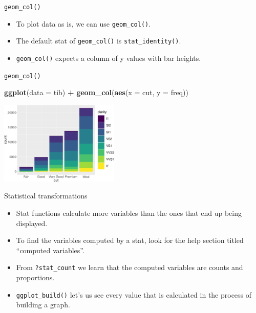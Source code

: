 \documentclass[ignorenonframetext,]{beamer}
\newenvironment{Shaded}{\begin{snugshade}}{\end{snugshade}}
\newcommand{\DataTypeTok}[1]{\textcolor[rgb]{0.13,0.29,0.53}{#1}}
\newcommand{\KeywordTok}[1]{\textcolor[rgb]{0.13,0.29,0.53}{\textbf{#1}}}
\newcommand{\NormalTok}[1]{#1}
\newcommand{\OperatorTok}[1]{\textcolor[rgb]{0.81,0.36,0.00}{\textbf{#1}}}
\newcommand{\StringTok}[1]{\textcolor[rgb]{0.31,0.60,0.02}{#1}}
\begin{document}
\begin{frame}[fragile]{\texttt{geom\_col()}}
\protect\hypertarget{geom_col}{}

\begin{itemize}
\item
  To plot data as is, we can use \texttt{geom\_col()}.
\item
  The default stat of \texttt{geom\_col()} is \texttt{stat\_identity()}.
\item
  \texttt{geom\_col()} expects a column of y values with bar heights.
\end{itemize}

\end{frame}

\begin{frame}[fragile]{\texttt{geom\_col()}}
\protect\hypertarget{geom_col-1}{}

\begin{Shaded}
\begin{Highlighting}[]
\KeywordTok{ggplot}\NormalTok{(}\DataTypeTok{data =}\NormalTok{ tib) }\OperatorTok{+}
\StringTok{  }\KeywordTok{geom_col}\NormalTok{(}\KeywordTok{aes}\NormalTok{(}\DataTypeTok{x =}\NormalTok{ cut, }\DataTypeTok{y =}\NormalTok{ freq))}
\end{Highlighting}
\end{Shaded}

\begin{center}\includegraphics[height=150px]{data-visualization_files/figure-beamer/unnamed-chunk-126-1} \end{center}

\end{frame}

\begin{frame}[fragile]{Statistical transformations}
\protect\hypertarget{statistical-transformations-7}{}

\begin{itemize}
\item
  Stat functions calculate more variables than the ones that end up
  being displayed.
\item
  To find the variables computed by a stat, look for the help section
  titled ``computed variables''.
\item
  From \texttt{?stat\_count} we learn that the computed variables are
  counts and proportions.
\item
  \texttt{ggplot\_build()} let's us see every value that is calculated
  in the process of building a graph.
\end{itemize}

\end{frame}
\end{document}
